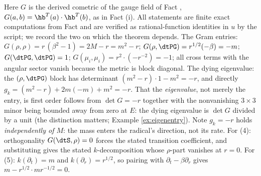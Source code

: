 Here $G$ is the derived cometric of the gauge field of Fact , $G(a,b) = \hb^{T}(a) \cdot \hb^{T}(b)$, as in Fact (i). All statements are finite exact computations from Fact  and are verified as rational-function identities in $u$ by the script; we record the two on which the theorem depends. The Gram entries: $G(\rho,\rho) = r\,(\beta^2 - 1) = 2M - r = m^2 - r$; $G(\rho, \dtPG) = r^{1/2}(-\beta) = -m$; $G(\dtPG,\dtPG) = 1$; $G(\mu_i,\mu_i) = r^2 \cdot (-r^{-2}) = -1$; all cross terms with the angular sector vanish because the metric is block diagonal. The dying eigenvalue: the $(\rho, \dtPG)$ block has determinant $(m^2 - r)\cdot 1 - m^2 = -r$, and directly $g_k = (m^2 - r) + 2m(-m) + m^2 = -r$. That the \emph{eigenvalue}, not merely the entry, is first order follows from $\det G = -r$ together with the nonvanishing $3 \times 3$ minor being bounded away from zero at $E$: the dying eigenvalue is $\det G$ divided by a unit (the distinction matters; Example \ref{ex:eigenentry}). Note $g_k = -r$ holds \emph{independently of $M$}: the mass enters the radical's direction, not its rate. For (4): orthogonality $G(\dtS, \rho) = 0$ forces the stated transition coefficient, and substituting gives the stated $k$-decomposition whose $\rho$-part vanishes at $r = 0$. For (5): $k(\partial_t) = m$ and $k(\partial_r) = r^{1/2}$, so pairing with $\partial_t - \beta \partial_r$ gives $m - r^{1/2}\cdot m r^{-1/2} = 0$.
